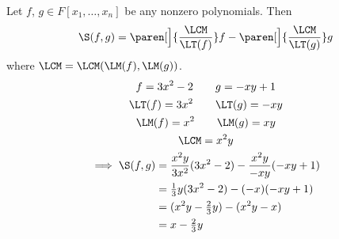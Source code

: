  Let $f$, $g\in F[x_1,\dotsc,x_n]$ be any nonzero polynomials.  Then
\[ \S(f,g) = \paren[\Big]{\frac{\LCM}{\LT(f)}}f-\paren[\Big]{\frac{\LCM}{\LT(g)}}g \]
where $\LCM=\LCM(\LM(f),\LM(g))$.
\begin{gather*}
f=3x^2-2 \qquad g = -xy+1 \\
\LT(f)=3x^2 \qquad \LT(g) = -xy \\
\LM(f)=x^2 \qquad \LM(g) = xy \\
\LCM = x^2y \\
\begin{aligned}
\implies \S(f,g) &= \frac{x^2y}{3x^2}(3x^2-2)-\frac{x^2y}{-xy}(-xy+1) \\
&= \tfrac13 y(3x^2-2)-(-x)(-xy+1) \\
&= (x^2y-\tfrac23y)-(x^2y-x) \\
&= x-\tfrac23y
\end{aligned}
\end{gather*}
